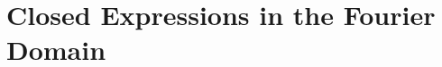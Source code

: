 \documentclass{masterthesis}
\begin{document}











\section{Closed Expressions in the Fourier Domain}
\end{document}
